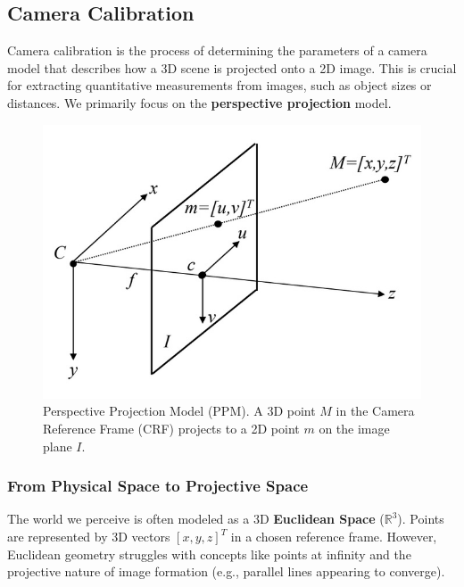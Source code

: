 
\subsection{Camera Calibration}

Camera calibration is the process of determining the parameters of a camera model that describes how a 3D scene is projected onto a 2D image. This is crucial for extracting quantitative measurements from images, such as object sizes or distances. We primarily focus on the \textbf{perspective projection} model.

\begin{figure}[htbp]
  \centering
  \includegraphics[width=0.5\linewidth]{./img/camera_calibration.jpg}
  \caption{Perspective Projection Model (PPM). A 3D point $M$ in the Camera Reference Frame (CRF) projects to a 2D point $m$ on the image plane $I$.}
\end{figure}

\subsubsection{From Physical Space to Projective Space}

The world we perceive is often modeled as a 3D \textbf{Euclidean Space} ($\mathbb{R}^3$). Points are represented by 3D vectors $[x, y, z]^T$ in a chosen reference frame. However, Euclidean geometry struggles with concepts like points at infinity and the projective nature of image formation (e.g., parallel lines appearing to converge).

